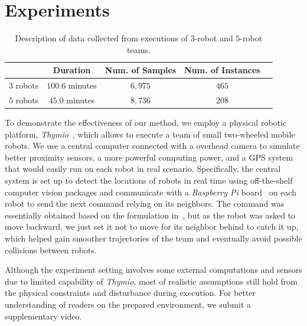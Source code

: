 \documentclass[letterpaper, 10 pt, conference]{ieeeconf}  %
\begin{document}
	\section{Experiments}
	\label{sec:experiments}

	\setlength{\tabcolsep}{0.5em} %
	{\renewcommand{\arraystretch}{1.2}%
		\begin{table}[t]
			\centering
			\begin{tabular}{|c|c|c|c|c|}
				\hline
							&  Duration & Num. of Samples & Num. of Instances  \\ \hline
				$3$ robots & $100.6$ minutes & $6,975$ & $465$  \\ \hline
				$5$ robots & $45.0$ minutes  & $8,736$ & $208$  \\ \hline
			\end{tabular}
			\caption{Description of data collected from executions of $3$-robot and $5$-robot teams.}
			\label{table:data_description}
		\end{table}
	}

	To demonstrate the effectiveness of our method, we employ a physical robotic platform,
	\emph{Thymio}~\cite{Shin14}, which allows to execute a team of small two-wheeled
	mobile robots. We use a central computer connected with a overhead camera to simulate
	better proximity
	sensors, a more powerful computing power, and a GPS system that would easily run on each robot in
	real scenario.
	Specifically, the central system is set up to detect the locations of robots in real
	time using off-the-shelf computer vision packages
	and communicate with a \emph{Raspberry Pi} board~\cite{Upton14} on each robot to send
	the next command relying on its neighbors.
	The command was essentially obtained based on the formulation in~\cite{CPR17}, but
    as the robot was asked to move backward, we just set it not to move for its
	neighbor behind to catch it up, which helped gain smoother trajectories of the team
	and eventually avoid possible collisions between robots.

	Although the experiment setting involves
	some external computations and sensors due to limited capability of \emph{Thymio},
	most of realistic assumptions still hold from the physical constraints and disturbance
	during execution. For better understanding of readers on the prepared environment,
	we submit a supplementary video.
\end{document}
